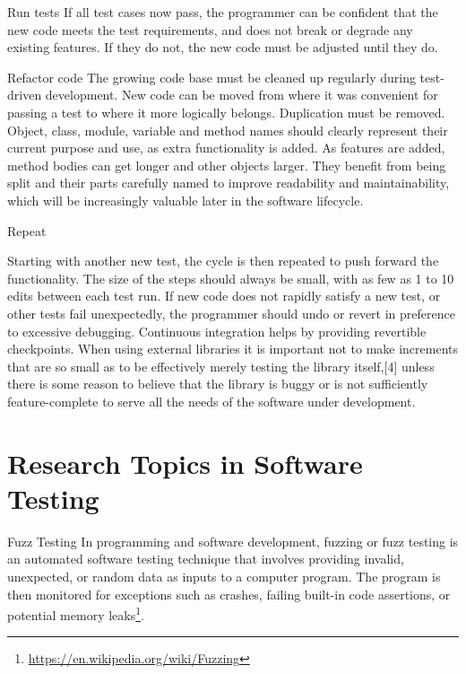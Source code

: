 \documentclass{beamer}
\begin{document}
\begin{frame}[t]{Run tests}
If all test cases now pass, the programmer can be confident that the new code meets the test requirements, and does not break or degrade any existing features. If they do not, the new code must be adjusted until they do.
    
\end{frame}


\begin{frame}[t]{Refactor code}
The growing code base must be cleaned up regularly during test-driven development. New code can be moved from where it was convenient for passing a test to where it more logically belongs. Duplication must be removed. Object, class, module, variable and method names should clearly represent their current purpose and use, as extra functionality is added. As features are added, method bodies can get longer and other objects larger. They benefit from being split and their parts carefully named to improve readability and maintainability, which will be increasingly valuable later in the software lifecycle. 
    
\end{frame}


\begin{frame}[t]{Repeat}
    
Starting with another new test, the cycle is then repeated to push forward the functionality. The size of the steps should always be small, with as few as 1 to 10 edits between each test run. If new code does not rapidly satisfy a new test, or other tests fail unexpectedly, the programmer should undo or revert in preference to excessive debugging. Continuous integration helps by providing revertible checkpoints. When using external libraries it is important not to make increments that are so small as to be effectively merely testing the library itself,[4] unless there is some reason to believe that the library is buggy or is not sufficiently feature-complete to serve all the needs of the software under development.
\end{frame}

\section{Research Topics in Software Testing}
\begin{frame}[t]{Fuzz Testing}
In programming and software development, fuzzing or fuzz testing is an automated software testing technique that involves providing invalid, unexpected, or random data as inputs to a computer program. The program is then monitored for exceptions such as crashes, failing built-in code assertions, or potential memory leaks\footnote{\url{https://en.wikipedia.org/wiki/Fuzzing}}.
\end{frame}
\end{document}
